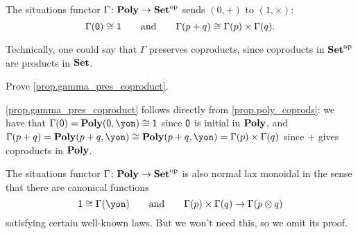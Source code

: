 \documentclass[Book-Poly]{subfiles}
\begin{document}
\begin{proposition}\label{prop.gamma_pres_coproduct}
The situations functor $\Gamma\colon\mathbf{Poly}\to\mathbf{Set}^{\textnormal{op}}$ sends $(0,+)$ to $(1,\times)$:
\[
	\Gamma(\textsf{0})\cong\textsf{1}
	\qquad\text{and}\qquad
	\Gamma(p+q)\cong\Gamma(p)\times\Gamma(q).
\]
\end{proposition}
Technically, one could say that $\Gamma$ preserves coproducts, since coproducts in $\mathbf{Set}^{\textnormal{op}}$ are products in $\mathbf{Set}$.

\begin{exercise}
Prove \cref{prop.gamma_pres_coproduct}.
\begin{solution}
\cref{prop.gamma_pres_coproduct} follows directly from \cref{prop.poly_coprods}: we have that $\Gamma(\0) = \poly(\0,\yon) \iso \1$ since $\textsf{0}$ is initial in $\mathbf{Poly}$, and $\Gamma(p + q) = \poly(p+q,\yon) \iso \poly(p+q,\yon) = \Gamma(p) \times \Gamma(q)$ since $+$ gives coproducts in $\mathbf{Poly}$.
\end{solution}
\end{exercise}

\begin{remark}
The situations functor $\Gamma\colon\mathbf{Poly}\to\mathbf{Set}^{\textnormal{op}}$ is also normal lax monoidal in the sense that there are canonical functions
\[
	\1\cong\Gamma(\yon)
	\qqand
	\Gamma(p)\times\Gamma(q)\to\Gamma(p\otimes q)
\]
satisfying certain well-known laws. But we won't need this, so we omit its proof.
\end{remark}


\end{document}
